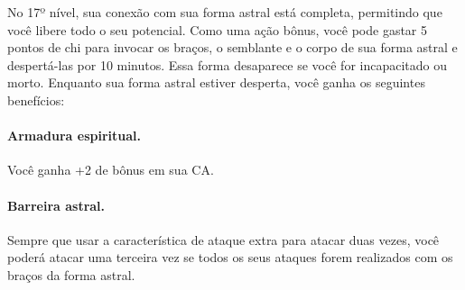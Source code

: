 \begin{multicols}{2}
No 17º nível, sua conexão com sua forma astral está completa, permitindo que
você libere todo o seu potencial. Como uma ação bônus, você pode gastar 5 pontos
de chi para invocar os braços, o semblante e o corpo de sua forma astral e
despertá-las por 10 minutos. Essa forma desaparece se você for incapacitado ou
morto.
Enquanto sua forma astral estiver desperta, você ganha os seguintes benefícios:

\paragraph{Armadura espiritual.}%
Você ganha +2 de bônus em sua CA.

\paragraph{Barreira astral.}%
Sempre que usar a característica de ataque extra para atacar duas vezes, você
poderá atacar uma terceira vez se todos os seus ataques forem realizados com os
braços da forma astral.

\end{multicols}
